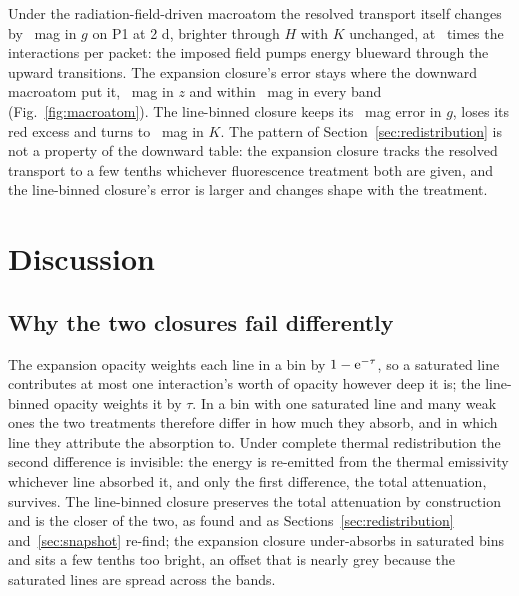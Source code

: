 \documentclass[fleqn,usenatbib]{mnras}
\newcommand{\Pone}{P1\xspace}
\begin{document}
Under the radiation-field-driven macroatom the resolved transport itself changes by \MacroRefShiftG\ mag in $g$ on \Pone at 2 d, brighter through $H$ with $K$ unchanged, at \MacroEvRatio\ times the interactions per packet: the imposed field pumps energy blueward through the upward transitions. The expansion closure's error stays where the downward macroatom put it, \MacroBtwoZ\ mag in $z$ and within \MacroBtwoAbsmax\ mag in every band (Fig.~\ref{fig:macroatom}). The line-binned closure keeps its \MacroBbinG\ mag error in $g$, loses its red excess and turns to \MacroBbinK\ mag in $K$. The pattern of Section~\ref{sec:redistribution} is not a property of the downward table: the expansion closure tracks the resolved transport to a few tenths whichever fluorescence treatment both are given, and the line-binned closure's error is larger and changes shape with the treatment.

\section{Discussion}\label{sec:discussion}

\subsection{Why the two closures fail differently}

The expansion opacity weights each line in a bin by $1-{\rm e}^{-\tau}$, so a saturated line contributes at most one interaction's worth of opacity however deep it is; the line-binned opacity weights it by $\tau$. In a bin with one saturated line and many weak ones the two treatments therefore differ in how much they absorb, and in which line they attribute the absorption to. Under complete thermal redistribution the second difference is invisible: the energy is re-emitted from the thermal emissivity whichever line absorbed it, and only the first difference, the total attenuation, survives. The line-binned closure preserves the total attenuation by construction and is the closer of the two, as \citet{fontes2020} found and as Sections~\ref{sec:redistribution} and~\ref{sec:snapshot} re-find; the expansion closure under-absorbs in saturated bins and sits a few tenths too bright, an offset that is nearly grey because the saturated lines are spread across the bands.
\end{document}
